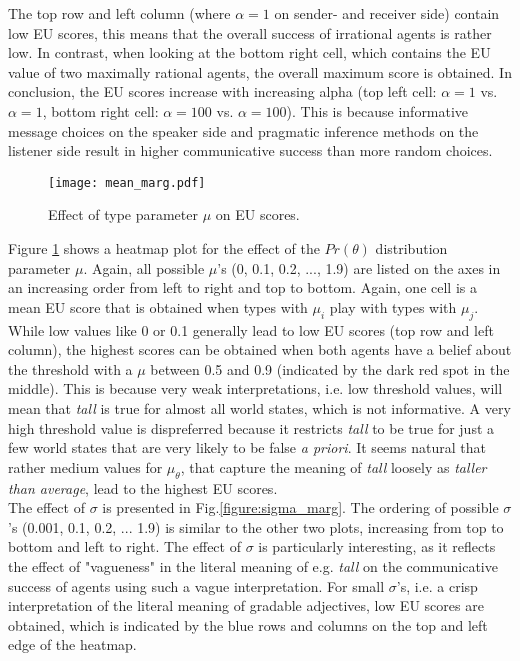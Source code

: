 The top row and left column (where $\alpha = 1$ on sender- and receiver side) contain low EU scores, this means that the overall success of irrational agents is rather low. In contrast, when looking at the bottom right cell, which contains the EU value of two maximally rational agents, the overall maximum score is obtained.
In conclusion, the EU scores increase with increasing alpha (top left cell: $\alpha=1$ vs. $\alpha=1$, bottom right cell: $\alpha=100$ vs. $\alpha=100$). This is because informative message choices on the speaker side and pragmatic inference methods on the listener side result in higher communicative success than more random choices. 
\begin{figure}[h]
 \centering
 \texttt{[image: mean\_marg.pdf]}
 \caption{Effect of type parameter $\mu$ on EU scores.}
 \label{figure:mean_marg}
\end{figure}
Figure \ref{figure:mean_marg} shows a heatmap plot for the effect of the $Pr(\theta)$ distribution parameter $\mu$. 
Again, all possible $\mu$'s (0, 0.1, 0.2, ..., 1.9) are listed on the axes in an increasing order from left to right and top to bottom. Again, one cell is a mean EU score that is obtained when types with $\mu_i$ play with types with $\mu_j$.
While low values like 0 or 0.1 generally lead to low EU scores (top row and left column), the highest scores can be obtained when both agents have a belief about the threshold with a $\mu$ between 0.5 and 0.9 (indicated by the dark red spot in the middle). This is because very weak interpretations, i.e. low threshold values, will mean that \textit{tall} is true for almost all world states, which is not informative. A very high threshold value is dispreferred because it restricts \textit{tall} to be true for just a few world states that are very likely to be false \textit{a priori}. It seems natural that rather medium values for $\mu_{\theta}$, that capture the meaning of \textit{tall} loosely as \textit{taller than average}, lead to the highest EU scores.\\

The effect of $\sigma$ is presented in Fig.\ref{figure:sigma_marg}. The ordering of possible $\sigma$'s (0.001, 0.1, 0.2, ... 1.9) is similar to the other two plots, increasing from top to bottom and left to right. The effect of $\sigma$ is particularly interesting, as it reflects the effect of "vagueness" in the literal meaning of e.g. \textit{tall} on the communicative success of agents using such a vague interpretation. For small $\sigma$'s, i.e. a crisp interpretation of the literal meaning of gradable adjectives, low EU scores are obtained, which is indicated by the blue rows and columns on the top and left edge of the heatmap.\\


